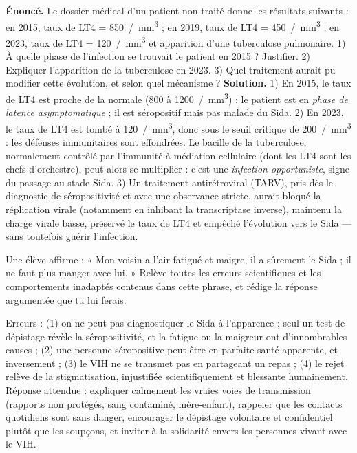 \documentclass[11pt]{article}
\begin{document}
\begin{exoresolu}
\textbf{Énoncé.} Le dossier médical d'un patient non traité donne les résultats suivants : en 2015, taux de LT4 = \SI{850}{/mm^3} ; en 2019, taux de LT4 = \SI{450}{/mm^3} ; en 2023, taux de LT4 = \SI{120}{/mm^3} et apparition d'une tuberculose pulmonaire. 1) À quelle phase de l'infection se trouvait le patient en 2015 ? Justifier. 2) Expliquer l'apparition de la tuberculose en 2023. 3) Quel traitement aurait pu modifier cette évolution, et selon quel mécanisme ?
\tcblower
\textbf{Solution.} 1) En 2015, le taux de LT4 est proche de la normale (\num{800} à \SI{1200}{/mm^3}) : le patient est en \emph{phase de latence asymptomatique} ; il est séropositif mais pas malade du Sida. 2) En 2023, le taux de LT4 est tombé à \SI{120}{/mm^3}, donc sous le seuil critique de \SI{200}{/mm^3} : les défenses immunitaires sont effondrées. Le bacille de la tuberculose, normalement contrôlé par l'immunité à médiation cellulaire (dont les LT4 sont les chefs d'orchestre), peut alors se multiplier : c'est une \emph{infection opportuniste}, signe du passage au stade Sida. 3) Un traitement antirétroviral (TARV), pris dès le diagnostic de séropositivité et avec une observance stricte, aurait bloqué la réplication virale (notamment en inhibant la transcriptase inverse), maintenu la charge virale basse, préservé le taux de LT4 et empêché l'évolution vers le Sida — sans toutefois guérir l'infection.
\end{exoresolu}

\begin{exercice}
Une élève affirme : « Mon voisin a l'air fatigué et maigre, il a sûrement le Sida ; il ne faut plus manger avec lui. » Relève toutes les erreurs scientifiques et les comportements inadaptés contenus dans cette phrase, et rédige la réponse argumentée que tu lui ferais.
\end{exercice}

\begin{corrige}[Exercice]
Erreurs : (1) on ne peut pas diagnostiquer le Sida à l'apparence ; seul un test de dépistage révèle la séropositivité, et la fatigue ou la maigreur ont d'innombrables causes ; (2) une personne séropositive peut être en parfaite santé apparente, et inversement ; (3) le VIH ne se transmet pas en partageant un repas ; (4) le rejet relève de la stigmatisation, injustifiée scientifiquement et blessante humainement. Réponse attendue : expliquer calmement les vraies voies de transmission (rapports non protégés, sang contaminé, mère-enfant), rappeler que les contacts quotidiens sont sans danger, encourager le dépistage volontaire et confidentiel plutôt que les soupçons, et inviter à la solidarité envers les personnes vivant avec le VIH.
\end{corrige}
\end{document}
